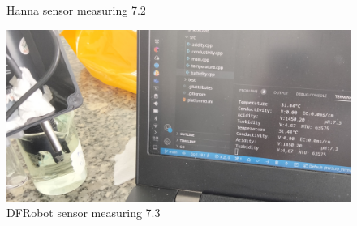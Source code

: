 \begin{figure}[h]
\begin{minipage}[b]{0.2\textwidth}
    \caption{Hanna sensor measuring 7.2}
  \end{minipage}
  \hfill
  \begin{minipage}[b]{0.7\textwidth}
    \includegraphics[width=\textwidth]{sensors/15_ph7_dfrobot.jpg}
    \caption{DFRobot sensor measuring 7.3}
  \end{minipage}
\end{figure}
